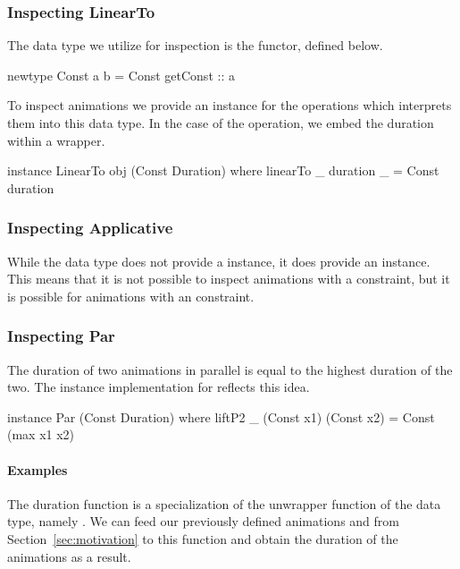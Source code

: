 \subsubsection{Inspecting LinearTo}

The data type we utilize for inspection is the  functor, defined below.

\begin{spec}
newtype Const a b = Const { getConst :: a }
\end{spec}

To inspect animations we provide an instance for the operations which interprets them into this data type. In the case of the  operation, we embed the duration within a  wrapper.

\begin{code}
instance LinearTo obj (Const Duration) where
  linearTo _ duration _ = Const duration
\end{code}

\subsubsection{Inspecting Applicative}

While the  data type does not provide a  instance, it does provide an  instance. This means that it is not possible to inspect animations with a  constraint, but it is possible for animations with an  constraint.

\subsubsection{Inspecting Par}

The duration of two animations in parallel is equal to the highest duration of the two. The  instance implementation for  reflects this idea. 

\begin{code}
instance Par (Const Duration) where
  liftP2 _ (Const x1) (Const x2) = Const (max x1 x2)
\end{code}

\paragraph{Examples}

The duration function is a specialization of the unwrapper function of the  data type, namely . We can feed our previously defined animations  and  from Section~\ref{sec:motivation} to this function and obtain the duration of the animations as a result.

